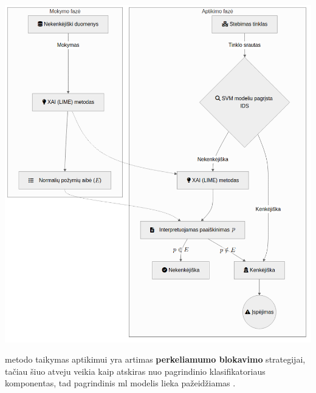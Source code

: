 \begin{minipage}{0.58\textwidth}
        \includegraphics[width=\textwidth]{images/ids.png}
        \captionsetup{justification=centering}
        \label{fig:ids}
\end{minipage}

\break

\LIME metodo taikymas  aptikimui yra artimas \textbf{perkeliamumo blokavimo}  strategijai, tačiau šiuo atveju \LIME veikia kaip atskiras nuo pagrindinio klasifikatoriaus komponentas, tad pagrindinis \gls{ml} modelis lieka pažeidžiamas .